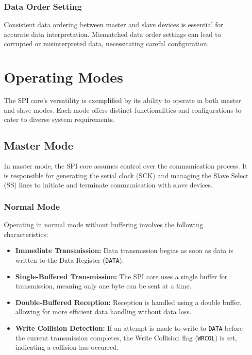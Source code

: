\documentclass{article}
\begin{document}
\subsubsection{Data Order Setting}
Consistent data ordering between master and slave devices is essential for accurate data interpretation. Mismatched data order settings can lead to corrupted or misinterpreted data, necessitating careful configuration.

\section{Operating Modes}
The SPI core's versatility is exemplified by its ability to operate in both master and slave modes. Each mode offers distinct functionalities and configurations to cater to diverse system requirements.

\subsection{Master Mode}
In master mode, the SPI core assumes control over the communication process. It is responsible for generating the serial clock (SCK) and managing the Slave Select (SS) lines to initiate and terminate communication with slave devices.

\subsubsection{Normal Mode}
Operating in normal mode without buffering involves the following characteristics:

\begin{itemize}
    \item \textbf{Immediate Transmission:} Data transmission begins as soon as data is written to the Data Register (\texttt{DATA}).
    \item \textbf{Single-Buffered Transmission:} The SPI core uses a single buffer for transmission, meaning only one byte can be sent at a time.
    \item \textbf{Double-Buffered Reception:} Reception is handled using a double buffer, allowing for more efficient data handling without data loss.
    \item \textbf{Write Collision Detection:} If an attempt is made to write to \texttt{DATA} before the current transmission completes, the Write Collision flag (\texttt{WRCOL}) is set, indicating a collision has occurred.
\end{itemize}
\end{document}
